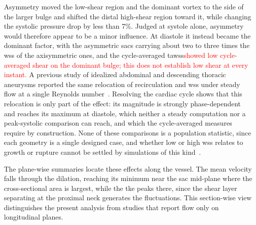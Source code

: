 \documentclass[12pt,a4paper]{article}
\newcommand{\cfdrevision}[1]{\textcolor{red}{#1}}
\newcommand{\WSS}{\ac{wss}\xspace}
\newcommand{\TAWSS}{\ac{tawss}\xspace}
\newcommand{\TKE}{\ac{tke}\xspace}
\theoremstyle{definition}
\numberwithin{equation}{section}
\begin{document}
Asymmetry moved the low-shear region and the dominant vortex to the side of the larger bulge and shifted the distal high-shear region toward it, while changing the systolic pressure drop by less than 7\%. Judged at systole alone, asymmetry would therefore appear to be a minor influence. At diastole it instead became the dominant factor, with the asymmetric sacs carrying about two to three times the \WSS of the axisymmetric ones, and the cycle-averaged \TAWSS \cfdrevision{showed low cycle-averaged shear on the dominant bulge; this does not establish low shear at every instant.} A previous study of idealized abdominal and descending thoracic aneurysms reported the same relocation of recirculation and \WSS under steady flow at a single Reynolds number~\cite{rehman2024comparative}. Resolving the cardiac cycle shows that this relocation is only part of the effect: its magnitude is strongly phase-dependent and reaches its maximum at diastole, which neither a steady computation nor a peak-systolic comparison can reach, and which the cycle-averaged measures require by construction. None of these comparisons is a population statistic, since each geometry is a single designed case, and whether low or high \WSS relates to growth or rupture cannot be settled by simulations of this kind~\cite{geers2017wall,lipp2020computational}.

The plane-wise summaries locate these effects along the vessel. The mean velocity falls through the dilation, reaching its minimum near the sac mid-plane where the cross-sectional area is largest, while the \TKE peaks there, since the shear layer separating at the proximal neck generates the fluctuations. This section-wise view distinguishes the present analysis from studies that report flow only on longitudinal planes.
\end{document}
